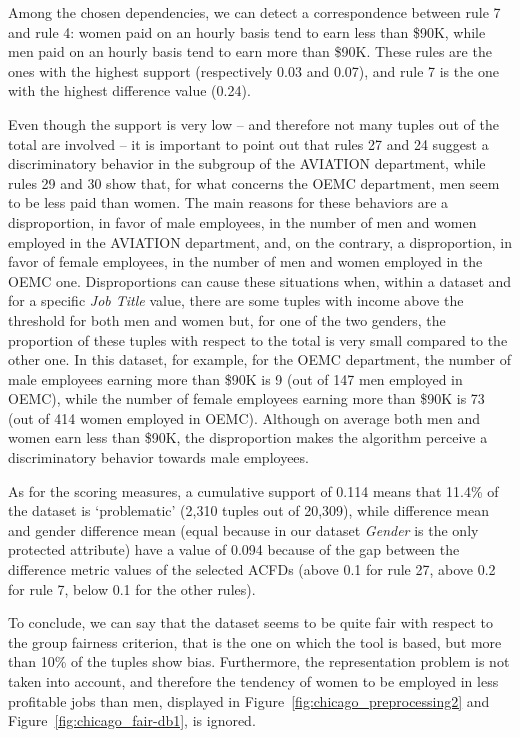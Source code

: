Among the chosen dependencies, we can detect a correspondence between rule 7 and rule 4: women paid on an hourly basis tend to earn less than \$90K, while men paid on an hourly basis tend to earn more than \$90K. These rules are the ones with the highest support (respectively 0.03 and 0.07), and rule 7 is the one with the highest difference value (0.24).

Even though the support is very low -- and therefore not many tuples out of the total are involved -- it is important to point out that rules 27 and 24 suggest a discriminatory behavior in the subgroup of the AVIATION department, while rules 29 and 30 show that, for what concerns the OEMC department, men seem to be less paid than women. The main reasons for these behaviors are a disproportion, in favor of male employees, in the number of men and women employed in the AVIATION department, and, on the contrary, a disproportion, in favor of female employees, in the number of men and women employed in the OEMC one. Disproportions can cause these situations when, within a dataset and for a specific \textit{Job Title} value, there are some tuples with income above the threshold for both men and women but, for one of the two genders, the proportion of these tuples with respect to the total is very small compared to the other one. In this dataset, for example, for the OEMC department, the number of male employees earning more than \$90K is 9 (out of 147 men employed in OEMC), while the number of female employees earning more than \$90K is 73 (out of 414 women employed in OEMC). Although on average both men and women earn less than \$90K, the disproportion makes the algorithm perceive a discriminatory behavior towards male employees.

As for the scoring measures, a cumulative support of 0.114 means that 11.4\% of the dataset is `problematic' (2,310 tuples out of 20,309), while difference mean and gender difference mean (equal because in our dataset \textit{Gender} is the only protected attribute) have a value of 0.094 because of the gap between the difference metric values of the selected ACFDs (above 0.1 for rule 27, above 0.2 for rule 7, below 0.1 for the other rules).

To conclude, we can say that the dataset seems to be quite fair with respect to the group fairness criterion, that is the one on which the tool is based, but more than 10\% of the tuples show bias. Furthermore, the representation problem is not taken into account, and therefore the tendency of women to be employed in less profitable jobs than men, displayed in Figure~\ref{fig:chicago_preprocessing2} and Figure~\ref{fig:chicago_fair-db1}, is ignored.


